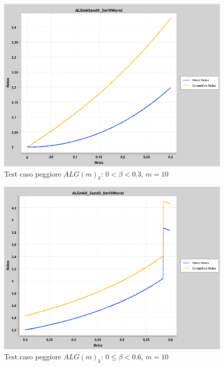 \documentclass[12pt]{article}
\begin{document}
\begin{figure}[H]
\caption{Test caso peggiore $ALG(m)_{k}$: $0 < \beta < 0.3$, $m = 10$}
\centering
\includegraphics[scale=0.4]{worst/ALGmk0and0_3m10Worst.png}
\end{figure}
\begin{figure}[H]
\caption{Test caso peggiore $ALG(m)_{k}$: $0 \leq \beta < 0.6$, $m = 10$}
\centering
\includegraphics[scale=0.4]{worst/ALGmk0_3and0_6m10Worst.png}
\end{figure}
\end{document}
